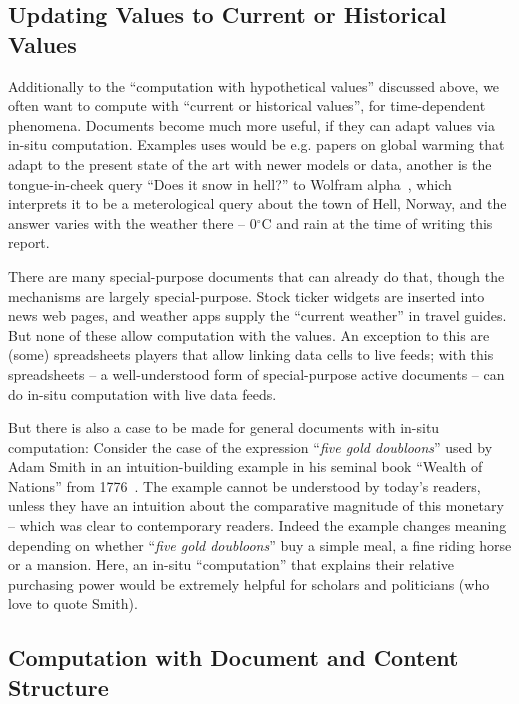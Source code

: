 \subsection{Updating Values to Current or Historical Values}

Additionally to the ``computation with hypothetical values'' discussed above, we often
want to compute with ``current or historical values'', for time-dependent
phenomena. Documents become much more useful, if they can adapt values via in-situ
computation. Examples uses would be e.g. papers on global warming that adapt to the
present state of the art with newer models or data, another is the tongue-in-cheek query
``Does it snow in hell?'' to Wolfram alpha~\cite{WolframAlpha:on}, which interprets it to
be a meterological query about the town of Hell, Norway, and the answer varies with the
weather there -- 0$^\circ$C and rain at the time of writing this report. 

There are many special-purpose documents that can already do that, though the mechanisms
are largely special-purpose. Stock ticker widgets are inserted into news web pages, and
weather apps supply the ``current weather'' in travel guides. But none of these allow
computation with the values. An exception to this are (some) spreadsheets players that
allow linking data cells to live feeds; with this spreadsheets -- a well-understood form
of special-purpose active documents -- can do in-situ computation with live data feeds.

But there is also a case to be made for general documents with in-situ computation:
Consider the case of the expression ``\emph{five gold doubloons}'' used by Adam Smith in
an intuition-building example in his seminal book ``Wealth of Nations'' from
1776~\cite{Smith:WoN1776}. The example cannot be understood by today's readers, unless
they have an intuition about the comparative magnitude of this monetary -- which was clear
to contemporary readers. Indeed the example changes meaning depending on whether
``\emph{five gold doubloons}'' buy a simple meal, a fine riding horse or a mansion. Here,
an in-situ ``computation'' that explains their relative purchasing power would be
extremely helpful for scholars and politicians (who love to quote Smith).

\subsection{Computation with Document and Content Structure}


